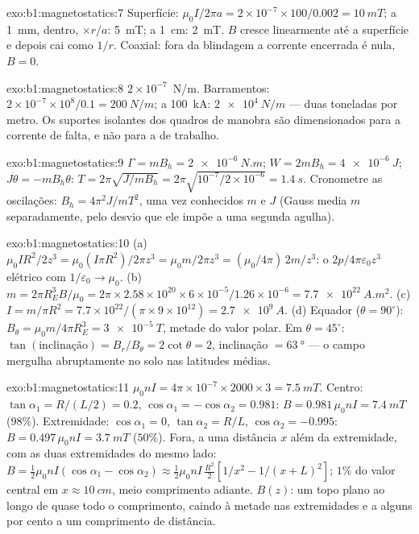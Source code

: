 \begin{solution}{exo:b1:magnetostatics:7}
Superfície: $\mu_0I/2\pi a = 2 \times 10^{-7} \times 100/0.002 = \qty{10}{mT}$; a
\qty{1}{mm}, dentro, $\times r/a$: \qty{5}{mT}; a \qty{1}{cm}: \qty{2}{mT}. $B$ cresce
linearmente até a superfície e depois cai como $1/r$. Coaxial: fora da blindagem
a corrente encerrada é nula, $B = 0$.
\end{solution}

\begin{solution}{exo:b1:magnetostatics:8}
$2 \times 10^{-7}$~N/m. Barramentos: $2 \times 10^{-7} \times 10^8/0.1 = \qty{200}{N/m}$;
a \qty{100}{kA}: $\qty{2e4}{N/m}$ --- duas toneladas por metro. Os suportes
isolantes dos quadros de manobra são dimensionados para a corrente de falta, e não
para a de trabalho.
\end{solution}

\begin{solution}{exo:b1:magnetostatics:9}
$\Gamma = mB_h = \qty{2e-6}{N.m}$; $W = 2mB_h = \qty{4e-6}{J}$; $J\ddot\theta =
-mB_h\theta$: $T = 2\pi\sqrt{J/mB_h} = 2\pi\sqrt{10^{-7}/2 \times 10^{-6}} =
\qty{1.4}{s}$. Cronometre as oscilações: $B_h = 4\pi^2J/mT^2$, uma vez conhecidos $m$ e $J$
(Gauss media $m$ separadamente, pelo desvio que ele impõe
a uma segunda agulha).
\end{solution}

\begin{solution}{exo:b1:magnetostatics:10}
(a) $\mu_0IR^2/2z^3 = \mu_0(I\pi R^2)/2\pi z^3 = \mu_0m/2\pi z^3 = (\mu_0/4\pi)\,2m/z^3$:
o $2p/4\pi\varepsilon_0z^3$ elétrico com $1/\varepsilon_0 \to \mu_0$. (b) $m = 2\pi R_E^3B/
\mu_0 = 2\pi \times 2.58 \times 10^{20} \times 6 \times 10^{-5}/1.26 \times 10^{-6} = \qty{7.7e22}{A.m^2}$.
(c) $I = m/\pi R^2 = 7.7 \times 10^{22}/(\pi \times 9 \times 10^{12}) = \qty{2.7e9}{A}$. (d)
Equador ($\theta = 90^\circ$): $B_\theta = \mu_0m/4\pi R_E^3 = \qty{3e-5}{T}$, metade do
valor polar. Em $\theta = 45^\circ$: $\tan(\text{inclinação}) = B_r/B_\theta = 2\cot\theta = 2$,
inclinação $= \qty{63}{\degree}$ --- o campo mergulha abruptamente no solo nas
latitudes médias.
\end{solution}

\begin{solution}{exo:b1:magnetostatics:11}
$\mu_0nI = 4\pi \times 10^{-7} \times 2000 \times 3 = \qty{7.5}{mT}$. Centro: $\tan\alpha_1 =
R/(L/2) = 0.2$, $\cos\alpha_1 = -\cos\alpha_2 = 0.981$: $B = 0.981\,\mu_0nI =
\qty{7.4}{mT}$ ($98\%$). Extremidade: $\cos\alpha_1 = 0$, $\tan\alpha_2 = R/L$, $\cos\alpha_2 =
-0.995$: $B = 0.497\,\mu_0nI = \qty{3.7}{mT}$ ($50\%$). Fora, a uma distância $x$ além da
extremidade, com as duas extremidades do mesmo lado: $B = \tfrac12\mu_0nI(\cos\alpha_1 - \cos\alpha_2)
\approx \tfrac12\mu_0nI\,\tfrac{R^2}{2}[1/x^2 - 1/(x + L)^2]$; $1\%$ do valor central
em $x \approx \qty{10}{cm}$, meio comprimento adiante. $B(z)$: um topo plano ao longo de
quase todo o comprimento, caindo à metade nas extremidades e a alguns por cento a um
comprimento de distância.
\end{solution}

